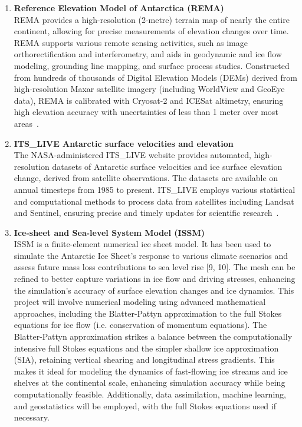 \begin{enumerate}
    \item\textbf{Reference Elevation Model of Antarctica (REMA)}\\
    REMA provides a high-resolution (2-metre) terrain map of nearly the entire continent, allowing for precise measurements of elevation changes over time. REMA supports various remote sensing activities, such as image orthorectification and interferometry, and aids in geodynamic and ice flow modeling, grounding line mapping, and surface process studies. Constructed from hundreds of thousands of Digital Elevation Models (DEMs) derived from high-resolution Maxar satellite imagery (including WorldView and GeoEye data), REMA is calibrated with Cryosat-2 and ICESat altimetry, ensuring high elevation accuracy with uncertainties of less than 1 meter over most areas~\cite{REMA}.

    \item\textbf{ITS\_LIVE Antarctic surface velocities and elevation}\\
    The NASA-administered ITS\_LIVE website provides automated, high-resolution datasets of Antarctic surface velocities and ice surface elevation change, derived from satellite observations. The datasets are available on annual timesteps from 1985 to present. ITS\_LIVE employs various statistical and computational methods to process data from satellites including Landsat and Sentinel, ensuring precise and timely updates for scientific research~\cite{itslive}.

    \item\textbf{Ice-sheet and Sea-level System Model (ISSM)}~\cite{ISSM}\\
    ISSM is a finite-element numerical ice sheet model. It has been used to simulate the Antarctic Ice Sheet’s response to various climate scenarios and assess future mass loss contributions to sea level rise [9, 10]. The mesh can be refined to better capture variations in ice flow and driving stresses, enhancing the simulation’s accuracy of surface elevation changes and ice dynamics. This project will involve numerical modeling using advanced mathematical approaches, including the Blatter-Pattyn approximation to the full Stokes equations for ice flow (i.e. conservation of momentum equations). The Blatter-Pattyn approximation strikes a balance between the computationally intensive full Stokes equations and the simpler shallow ice approximation (SIA), retaining vertical shearing and longitudinal stress gradients. This makes it ideal for modeling the dynamics of fast-flowing ice streams and ice shelves at the continental scale, enhancing simulation accuracy while being computationally feasible. Additionally, data assimilation, machine learning, and geostatistics will be employed, with the full Stokes equations used if necessary.
\end{enumerate}


